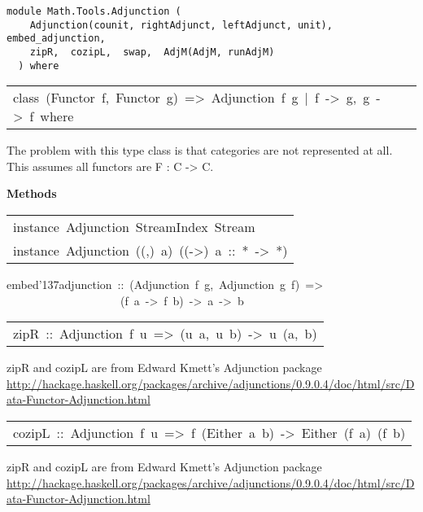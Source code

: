 \label{module:Math.Tools.Adjunction}
\haddockbeginheader
{\haddockverb\begin{verbatim}
module Math.Tools.Adjunction (
    Adjunction(counit, rightAdjunct, leftAdjunct, unit),  embed_adjunction, 
    zipR,  cozipL,  swap,  AdjM(AdjM, runAdjM)
  ) where\end{verbatim}}
\haddockendheader

\begin{haddockdesc}
\item[\begin{tabular}{@{}l}
class\ (Functor\ f,\ Functor\ g)\ =>\ Adjunction\ f\ g\ |\ f\ ->\ g,\ g\ ->\ f\ where
\end{tabular}]\haddockbegindoc
The problem with this type class is that categories are not represented
 at all. This assumes all functors are F : C -> C.\par

\haddockpremethods{}\textbf{Methods}
\end{haddockdesc}
\begin{haddockdesc}
\item[\begin{tabular}{@{}l}
instance\ Adjunction\ StreamIndex\ Stream\\instance\ Adjunction\ ((,)\ a)\ ((->)\ a\ ::\ *\ ->\ *)
\end{tabular}]
\end{haddockdesc}
\begin{haddockdesc}
\item[
embed{\char '137}adjunction\ ::\ (Adjunction\ f\ g,\ Adjunction\ g\ f)\ =>\\\ \ \ \ \ \ \ \ \ \ \ \ \ \ \ \ \ \ \ \ (f\ a\ ->\ f\ b)\ ->\ a\ ->\ b
]
\end{haddockdesc}
\begin{haddockdesc}
\item[\begin{tabular}{@{}l}
zipR\ ::\ Adjunction\ f\ u\ =>\ (u\ a,\ u\ b)\ ->\ u\ (a,\ b)
\end{tabular}]\haddockbegindoc
zipR and cozipL are from Edward Kmett's Adjunction package
 \url{http://hackage.haskell.org/packages/archive/adjunctions/0.9.0.4/doc/html/src/Data-Functor-Adjunction.html}\par

\end{haddockdesc}
\begin{haddockdesc}
\item[\begin{tabular}{@{}l}
cozipL\ ::\ Adjunction\ f\ u\ =>\ f\ (Either\ a\ b)\ ->\ Either\ (f\ a)\ (f\ b)
\end{tabular}]\haddockbegindoc
zipR and cozipL are from Edward Kmett's Adjunction package
 \url{http://hackage.haskell.org/packages/archive/adjunctions/0.9.0.4/doc/html/src/Data-Functor-Adjunction.html}\par

\end{haddockdesc}
